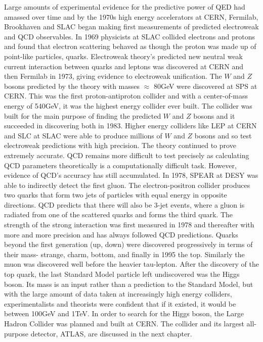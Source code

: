 Large amounts of experimental evidence for the predictive power of QED had amassed over time and by the 1970s high energy accelerators at CERN, Fermilab, Brookhaven and SLAC began making first measurements of predicted electroweak and QCD observables. In 1969 physicists at SLAC collided electrons and protons and found that electron scattering behaved as though the proton was made up of point-like particles, quarks. Electroweak theory's predicted new neutral weak current interaction between quarks and leptons was discovered at CERN and then Fermilab in 1973, giving evidence to electroweak unification. The $W$ and $Z$ bosons predicted by the theory with masses $\approx$ 80GeV were discovered at SPS at CERN. This was the first proton-antiproton collider and with a center-of-mass energy of 540GeV, it was the highest energy collider ever built. The collider was built for the main purpose of finding the predicted $W$ and $Z$ bosons and it succeeded in discovering both in 1983. Higher energy colliders like LEP at CERN and SLC at SLAC were able to produce millions of $W$ and $Z$ bosons and so test electroweak predictions with high precision. The theory continued to prove extremely accurate. QCD remains more difficult to test precisely as calculating QCD parameters theoretically is a computationally difficult task. However, evidence of QCD's accuracy has still accumulated. In 1978, SPEAR at DESY was able to indirectly detect the first gluon. The electron-positron collider produces two quarks that form two jets of particles with equal energy in opposite directions. QCD predicts that there will also be 3-jet events, where a gluon is radiated from one of the scattered quarks and forms the third quark. The strength of the strong interaction was first measured in 1978 and thereafter with more and more precision and has always followed QCD predictions. Quarks beyond the first generation (up, down) were discovered progressively in terms of their mass- strange, charm, bottom, and finally in 1995 the top. Similarly the muon was discovered well before the heavier tau-lepton. After the discovery of the top quark, the last Standard Model particle left undiscovered was the Higgs boson. Its mass is an input rather than a prediction to the Standard Model, but with the large amount of data taken at increasingly high energy colliders, experimentalists and theorists were confident that if it existed, it would be between 100GeV and 1TeV. In order to search for the Higgs boson, the Large Hadron Collider was planned and built at CERN. The collider and its largest all-purpose detector, ATLAS, are discussed in the next chapter. 

